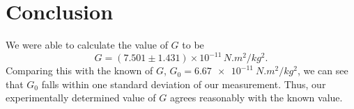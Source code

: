 \documentclass[aps, reprint,amsmath,amssymb]{revtex4-1} %
\begin{document}
\section{Conclusion}

We were able to calculate the value of $G$ to be
\[
    G = (7.501 \pm 1.431)\times 10^{-11} \,\si{N.m^2/kg^2}.
\]
Comparing this with the known of $G$, $G_0 = \SI{6.67e-11}{N.m^2/kg^2}$, we can
see that $G_0$ falls within one standard deviation of our measurement.
Thus, our experimentally determined value of $G$ agrees reasonably with the
known value. 
\end{document}
